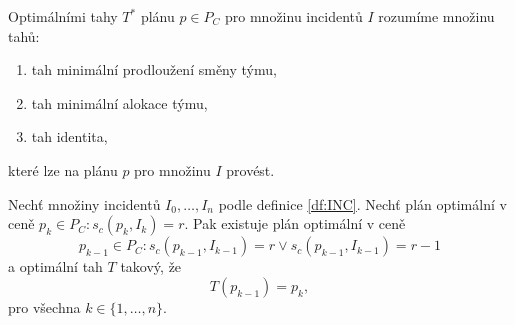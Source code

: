 \begin{definice}\label{df:optimalniTahy}
  Optimálními tahy $T^*$ plánu $p \in P_C$ pro množinu incidentů $I$ rozumíme množinu tahů:
  \begin{enumerate}
  \item
    tah minimální prodloužení směny týmu,
  \item
    tah minimální alokace týmu,
  \item
    tah identita,
  \end{enumerate}
  které lze na plánu $p$ pro množinu $I$ provést.
\end{definice}

\begin{veta}\label{veta:optimalniTahy}
  Nechť množiny incidentů $I_0, \dots, I_n$ podle definice \ref{df:INC}.
  Nechť plán optimální v ceně $p_k \in P_C \colon s_c(p_k, I_k) = r$.
  Pak existuje plán optimální v ceně
  \begin{equation*}
    p_{k-1} \in P_C \colon s_c(p_{k-1}, I_{k-1}) = r \lor s_c(p_{k-1}, I_{k-1}) = r - 1
  \end{equation*}
  a optimální tah $T$ takový, že
  \begin{equation*}
    T(p_{k-1}) = p_k,
  \end{equation*}
  pro všechna $k \in \{ 1, \dots, n\}$.
\end{veta}
